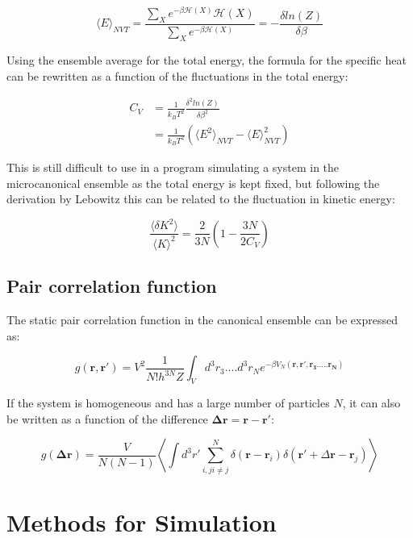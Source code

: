 \documentclass[
10pt, %
a4paper, %
oneside, %
headinclude,footinclude, %
BCOR5mm, %
]{scrartcl}
\begin{document}
$$ \langle E\rangle_{NVT} = \frac{ \sum_X e^{-\beta \mathcal{H}(X)} \mathcal{H}(X)}{ \sum_X e^{-\beta \mathcal{H}(X)}} = - \frac{\delta ln(Z)}{\delta \beta} $$

\noindent
Using the ensemble average for the total energy, the formula for the specific heat can be rewritten as a function of the fluctuations in the total energy:

\begin{align}
C_V &= \frac{1}{k_B T^2} \frac{\delta^2 ln(Z)}{\delta \beta^2} \\
&= \frac{1}{k_B T^2} \left ( \langle E^2\rangle_{NVT} - \langle E\rangle^2_{NVT} \right )
\end{align}

\noindent
This is still difficult to use in a program simulating a system in the microcanonical ensemble as the total energy is kept fixed, but following the derivation by Lebowitz\cite{Duane:1985lz} this can be related to the fluctuation in kinetic energy:

$$ \frac{\langle\delta K^2\rangle}{\langle K\rangle^2} = \frac{2}{3N} \left ( 1 - \frac{3N}{2C_V} \right ) $$



\subsection{Pair correlation function}

The static pair correlation function in the canonical ensemble can be expressed as:

$$ g(\mathbf{r,r'}) = V^2 \frac{1}{N!h^{3N}Z} \int_V d^3r_3....d^3r_N e^{-\beta V_N(\mathbf{r,r',r_3.....r_N})} $$

\noindent
If the system is homogeneous and has a large number of particles $N$, it can also be written as a function of the difference $\mathbf{\Delta r} = \mathbf{r} - \mathbf{r'}$:

$$ g(\mathbf{\Delta r}) = \frac{V}{N(N-1)}  \left \langle \int d^3r' \sum_{i,j i \neq j}^N \delta(\mathbf{r}-\mathbf{r}_i) \delta(\mathbf{r'} + \Delta\mathbf{r} - \mathbf{r}_j) \right \rangle $$

\newpage

\section{Methods for Simulation}
\end{document}
